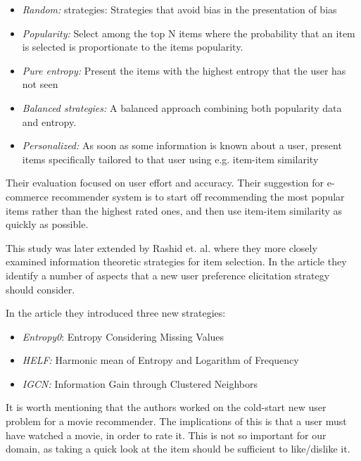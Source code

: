 \begin{itemize}
\item \emph{Random:} strategies: Strategies that avoid bias in the presentation of bias
\item \emph{Popularity:} Select among the top N items where the probability that an item is selected is proportionate to the items popularity.
\item \emph{Pure entropy:} Present the items with the highest entropy that the user has not seen
\item \emph{Balanced strategies:} A balanced approach combining both popularity data and entropy.
\item \emph{Personalized:} As soon as some information is known about a user, present items specifically tailored to that user using e.g. item-item similarity
\end{itemize}

Their evaluation focused on user effort and accuracy. Their suggestion for e-commerce recommender system is to start off recommending the most popular items rather than the highest rated ones, and then use item-item similarity as quickly as possible.

This study was later extended by Rashid et. al. \cite{Rashid2008} where they more closely examined information theoretic strategies for item selection. In the article they identify a number of aspects that a new user preference elicitation strategy should consider.

In the article they introduced three new strategies:

\begin{itemize}
\item \emph{Entropy0}: Entropy Considering Missing Values
\item \emph{HELF:} Harmonic mean of Entropy and Logarithm of Frequency
\item \emph{IGCN:} Information Gain through Clustered Neighbors
\end{itemize}



It is worth mentioning that the authors worked on the cold-start new user problem for a movie recommender. The implications of this is that a user must have watched a movie, in order to rate it. This is not so important for our domain, as taking a quick look at the item should be sufficient to like/dislike it.

